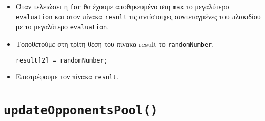 \begin{itemize}
\item Όταν τελειώσει η \lstinline!for! θα έχουμε αποθηκευμένο στη \lstinline!max! το μεγαλύτερο \lstinline!evaluation! και στον πίνακα \lstinline!result! τις 
αντίστοιχες συντεταγμένες του πλακιδίου με το μεγαλύτερο \lstinline!evaluation!.

\item Τοποθετούμε στη τρίτη θέση του πίνακα result το \lstinline!randomNumber!.
\begin{lstlisting}[breaklines=true, numbers=none, aboveskip=\smallskipamount, belowskip=\smallskipamount, captionpos=none]
result[2] = randomNumber;
\end{lstlisting}

\item Επιστρέφουμε τον πίνακα \lstinline!result!.
\end{itemize}

\section{\lstinline[basicstyle=\ttfamily]!updateOpponentsPool()!} \label{sec:updateOpponentsPool}